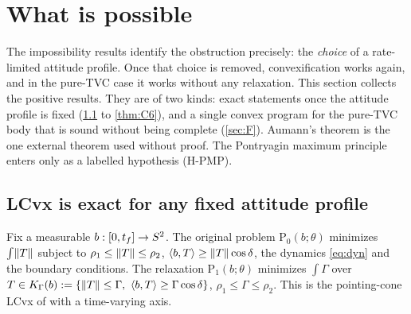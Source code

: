 \section{What is possible}\label{sec:possibility}
The impossibility results identify the obstruction precisely: the \emph{choice} of a rate-limited attitude profile. Once
that choice is removed, convexification works again, and in the pure-TVC case it works without any relaxation. This
section collects the positive results. They are of two kinds: exact statements once the attitude profile is fixed
(\cref{sec:C} to \cref{thm:C6}), and a single convex program for the pure-TVC body that is sound without being complete
(\cref{sec:F}). Aumann's theorem \cite{aumann1965} is the one external theorem used without proof.
The Pontryagin maximum principle \cite{pontryagin1962,vinter2000book} enters only as a labelled hypothesis (H-PMP).

\subsection{LCvx is exact for any fixed attitude profile}\label{sec:C}
Fix a measurable $b:[0,t_f]\to S^2$. The original problem $\mathrm P_0(b;\theta)$ minimizes $\int\lVert T\rVert$ subject to
$\rho_1\le\lVert T\rVert\le\rho_2$, $\langle b,T\rangle\ge\lVert T\rVert\cos\delta$, the dynamics \eqref{eq:dyn} and the boundary conditions. The relaxation
$\mathrm P_1(b;\theta)$ minimizes $\int\Gamma$ over $T\in K_\Gamma(b):=\{\norm T\le\Gamma,\ \ip bT\ge\Gamma\cos\delta\}$,
$\rho_1\le\Gamma\le\rho_2$. This is the pointing-cone LCvx of \cite{acikmese2013tcst} with a time-varying axis.

